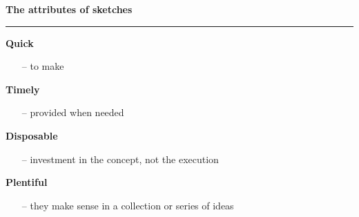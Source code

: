\documentclass[pdf]{beamer}
\begin{document}
\newlength{\seplinewidth}
\newlength{\seplinesep}
\setlength{\seplinewidth}{1mm}
\setlength{\seplinesep}{2mm}
\newcommand*{\sepline}{%
  \par
  \cleaders\vbox{%
    \begingroup %
      \color{sepline}%
      \hrule width\linewidth height\seplinewidth
    \endgroup
  }\vskip\seplinewidth
  \vspace{-0.85cm}
}
\begin{frame}
\vspace{8mm}
\textcolor{myBlue}{\textbf{\Large{The attributes of sketches}}}

\textcolor{red}{\rule{10cm}{1mm}}

\begin{samepage}    
    \begin{multicols}{2}
	\textbf{Quick} \par
    \begin{itemize}
      \item[\textcolor{black}{--}] to make
    \end{itemize}
    \textbf{Timely} \par
    \begin{itemize}
      \item[\textcolor{black}{--}] provided when needed
    \end{itemize}
      \textbf{Disposable} \par
    \begin{itemize}
      \item[\textcolor{black}{--}] investment in the concept, not the execution
    \end{itemize}
      \textbf{Plentiful} \par
    \begin{itemize}
      \item[\textcolor{black}{--}] they make sense in a collection or series of ideas
    \end{itemize}    
	\end{multicols}
   \end{samepage}
\end{frame}
\end{document}
